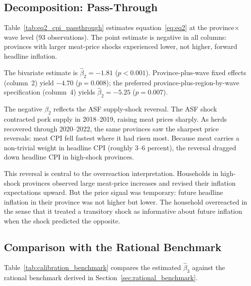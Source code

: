 \subsection{Decomposition: Pass-Through}%
\label{sec:eq2_results}



Table~\ref{tab:eq2_cpi_passthrough} estimates
equation~\eqref{eq:eq2} at the province$\times$wave level
(93 observations).
The point estimate is negative in all columns: provinces with
larger meat-price shocks experienced lower, not higher,
forward headline inflation.

The bivariate estimate is $\hat{\beta}_2 = -1.81$ ($p < 0.001$).
Province-plus-wave fixed effects (column~2) yield $-4.70$
($p = 0.008$); the preferred province-plus-region-by-wave
specification (column~4) yields $\hat{\beta}_2 = -5.25$
($p = 0.007$).

The negative $\beta_2$ reflects the ASF supply-shock reversal.
The ASF shock contracted pork supply in 2018--2019, raising
meat prices sharply.
As herds recovered through 2020--2022, the same provinces saw
the sharpest price reversals: meat CPI fell fastest where it
had risen most.
Because meat carries a non-trivial weight in headline CPI
(roughly 3--6 percent), the reversal dragged down headline CPI
in high-shock provinces.

This reversal is central to the overreaction interpretation.
Households in high-shock provinces observed large meat-price
increases and revised their inflation expectations upward.
But the price signal was temporary: future headline inflation in
their province was not higher but lower.
The household overreacted in the sense that it treated a
transitory shock as informative about future inflation when
the shock predicted the opposite.

\subsection{Comparison with the Rational Benchmark}%
\label{sec:calibration}



Table~\ref{tab:calibration_benchmark} compares the estimated
$\hat{\beta}_3$ against the rational benchmark derived in
Section~\ref{sec:rational_benchmark}.

